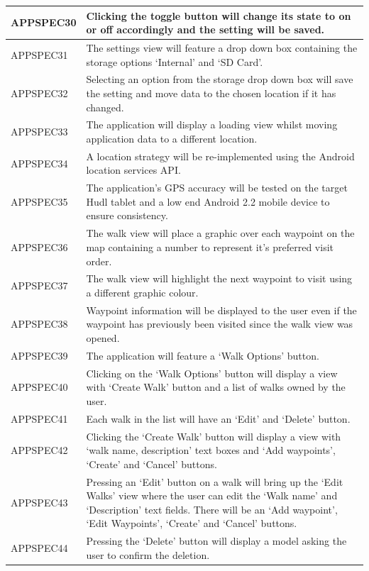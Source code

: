 \documentclass[11pt,a4paper]{article}
\begin{document}
\begin{longtable}{|p{2.5cm}p{13cm}|}
APPSPEC30 & Clicking the toggle button will change its state to on or off accordingly and the setting will be saved. \\ \hline
APPSPEC31 & The settings view will feature a drop down box containing the storage options `Internal' and `SD Card'. \\ \hline
APPSPEC32 & Selecting an option from the storage drop down box will save the setting and move data to the chosen location if it has changed. \\ \hline
APPSPEC33 & The application will display a loading view whilst moving application data to a different location. \\ \hline
APPSPEC34 & A location strategy will be re-implemented using the Android location services API. \\ \hline
APPSPEC35 & The application's GPS accuracy will be tested on the target Hudl tablet and a low end Android 2.2 mobile device to ensure consistency. \\ \hline
APPSPEC36 & The walk view will place a graphic over each waypoint on the map containing a number to represent it's preferred visit order. \\ \hline
APPSPEC37 & The walk view will highlight the next waypoint to visit using a different graphic colour. \\ \hline
APPSPEC38 & Waypoint information will be displayed to the user even if the waypoint has previously been visited since the walk view was opened. \\ \hline
APPSPEC39 & The application will feature a `Walk Options' button.\\ \hline
APPSPEC40 & Clicking on the `Walk Options' button will display a view with `Create Walk' button and a list of walks owned by the user. \\ \hline
APPSPEC41 & Each walk in the list will have an `Edit' and `Delete' button.\\ \hline
APPSPEC42 & Clicking the `Create Walk' button will display a view with `walk name, description' text boxes and `Add waypoints', `Create' and `Cancel' buttons.\\ \hline
APPSPEC43 & Pressing an `Edit' button on a walk will bring up the `Edit Walks' view where the user can edit the `Walk name' and `Description' text fields. There will be an `Add waypoint', `Edit Waypoints', `Create' and `Cancel' buttons. \\ \hline
APPSPEC44 & Pressing the `Delete' button will display a model asking the user to confirm the deletion. \\ \hline

\end{longtable}
\end{document}
